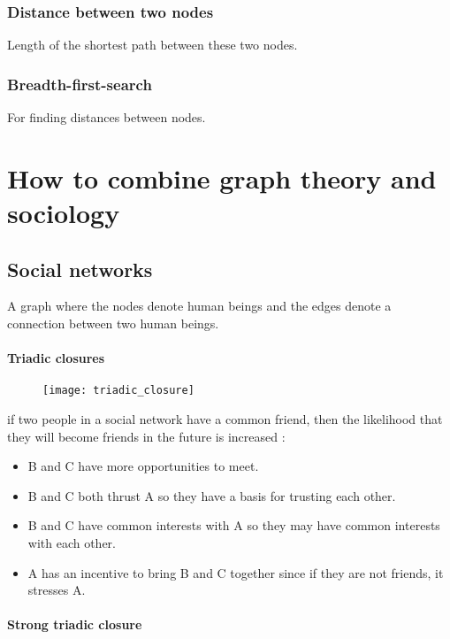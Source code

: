\subsection{Distance between two nodes}

Length of the shortest path between these two nodes.

\subsection{Breadth-first-search}

For finding distances between nodes.

\chapter{How to combine graph theory and sociology}

\section{Social networks}

A graph where the nodes denote human beings and the edges denote a connection between two human beings.

\subsubsection{Triadic closures}

\begin{figure}[H]
    \centering
    \texttt{[image: triadic\_closure]}
\end{figure}

if two people in a social network have a common friend, then the likelihood that they will become friends in the future is increased :

\begin{itemize}
\item B and C have more opportunities to meet.
\item B and C both thrust A so they have a basis for trusting each other.
\item B and C have common interests with A so they may have common interests with each other.
\item A has an incentive to bring B and C together since if they are not friends, it stresses A.
\end{itemize}

\subsubsection{Strong triadic closure}


